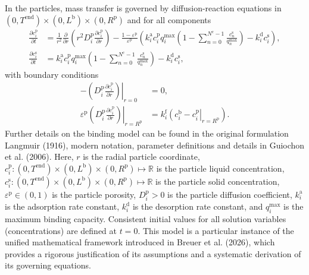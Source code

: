 \documentclass{article}
\begin{document}
In the particles, mass transfer is governed by diffusion-reaction equations in $(0, T^{\mathrm{end}}) \times (0, L^{\mathrm{b}})\times (0, R^{\mathrm{p}})$ and for all components
\begin{align}
    \frac{\partial c^{\mathrm{p}}_{i}}{\partial t}
    &= \frac{1}{r^{2}} \frac{\partial }{\partial r} \left( r^{2} D^{\mathrm{p}}_{i} \frac{\partial c^{\mathrm{p}}_{i}}{\partial r} \right)
        - \frac{1 - \varepsilon^{\mathrm{p}}}{\varepsilon^{\mathrm{p}}}\left(k^{\mathrm{a}}_{i} c^{\mathrm{p}}_{i} q^{\mathrm{max}}_{i} \left( 1 - \sum_{n=0}^{N^{\mathrm{c}} - 1} \frac{c^{\mathrm{s}}_{n}}{q^{\mathrm{max}}_{n}} \right) - k^{\mathrm{d}}_{i} c^{\mathrm{s}}_{i} \right),
    \\
    \frac{\partial c^{\mathrm{s}}_{i}}{\partial t}
    &= k^{\mathrm{a}}_{i} c^{\mathrm{p}}_{i} q^{\mathrm{max}}_{i} \left( 1 - \sum_{n=0}^{N^{\mathrm{c}} - 1} \frac{c^{\mathrm{s}}_{n}}{q^{\mathrm{max}}_{n}} \right)
        - k^{\mathrm{d}}_{i} c^{\mathrm{s}}_{i},
\end{align}
with boundary conditions
\begin{align}
    - \left. \left( D^{\mathrm{p}}_{i} \frac{\partial c^{\mathrm{p}}_{i}}{\partial r} \right) \right|_{r=0}
    &= 0,
    \\
    \varepsilon^{\mathrm{p}} \left. \left( D^{\mathrm{p}}_{i} \frac{\partial c^{\mathrm{p}}_{i}}{\partial r} \right)\right|_{r = R^{\mathrm{p}}}
    &= k^{\mathrm{f}}_{i} \left. \left( c^{\mathrm{b}}_{i} - c^{\mathrm{p}}_{i} \right|_{r = R^{\mathrm{p}}} \right).
\end{align}
Further details on the binding model can be found in the original formulation Langmuir (1916), modern notation, parameter definitions and details in Guiochon et al. (2006).
Here, $r$ is the radial particle coordinate, $c^{\mathrm{p}}_{i}\colon (0, T^{\mathrm{end}}) \times (0, L^{\mathrm{b}})\times (0, R^{\mathrm{p}}) \mapsto \mathbb{R}$ is the particle liquid concentration, $c^{\mathrm{s}}_{i}\colon (0, T^{\mathrm{end}}) \times (0, L^{\mathrm{b}})\times (0, R^{\mathrm{p}}) \mapsto \mathbb{R}$ is the particle solid concentration, $\varepsilon^{\mathrm{p}}\in (0, 1)$ is the particle porosity, $D^{\mathrm{p}}_{i}> 0$ is the particle diffusion coefficient, $k^{\mathrm{a}}_{i}$ is the adsorption rate constant, $k^{\mathrm{d}}_{i}$ is the desorption rate constant, and $q^{\mathrm{max}}_{i}$ is the maximum binding capacity.
Consistent initial values for all solution variables (concentrations) are defined at $t = 0$.
This model is a particular instance of the unified mathematical framework introduced in Breuer et al. (2026), which provides a rigorous justification of its assumptions and a systematic derivation of its governing equations.
\end{document}
